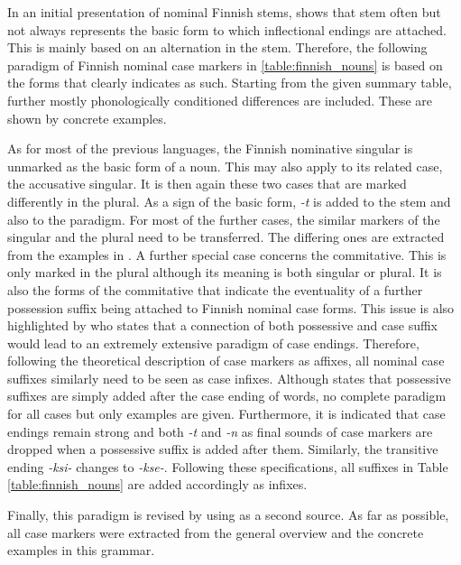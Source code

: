 \documentclass[11pt,a4paper,twoside,openright]{scrbook}
\begin{document}
In an initial presentation of nominal Finnish stems, \citet{white2008finn} shows that stem often but not always represents the basic form to which inflectional endings are attached. This is mainly based on an alternation in the stem. Therefore, the following paradigm of Finnish nominal case markers in \ref{table:finnish_nouns} is based on the forms that \citet{white2008finn} clearly indicates as such. Starting from the given summary table, further mostly phonologically conditioned differences are included. These are shown by concrete examples. 

As for most of the previous languages, the Finnish nominative singular is unmarked as the basic form of a noun. This may also apply to its related case, the accusative singular. It is then again these two cases that are marked differently in the plural. As a sign of the basic form, \textit{-t} is added to the stem and also to the paradigm. For most of the further cases, the similar markers of the singular and the plural need to be transferred. The differing ones are extracted from the examples in \citet{white2008finn}. A further special case concerns the commitative. This is only marked in the plural although its meaning is both singular or plural. It is also the forms of the commitative that indicate the eventuality of a further possession suffix being attached to Finnish nominal case forms. This issue is also highlighted by \citet{blake1994case} who states that a connection of both possessive and case suffix would lead to an extremely extensive paradigm of case endings. Therefore, following the theoretical description of case markers as affixes, all nominal case suffixes similarly need to be seen as case infixes. Although \citet{white2008finn} states that possessive suffixes are simply added after the case ending of words, no complete paradigm for all cases but only examples are given. Furthermore, it is indicated that case endings remain strong and both \textit{-t} and \textit{-n} as final sounds of case markers are dropped when a possessive suffix is added after them. Similarly, the transitive ending \textit{-ksi-} changes to \textit{-kse-}. Following these specifications, all suffixes in Table \ref{table:finnish_nouns} are added accordingly as infixes.

Finally, this paradigm is revised by using \citet{karlsson2018finn} as a second source. As far as possible, all case markers were extracted from the general overview and the concrete examples in this grammar.
\end{document}
